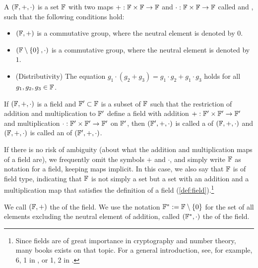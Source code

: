 \begin{definition}[Field]\label{def:field}
A  $ (\mathbb{F}, +, \cdot) $ is a set $\mathbb{F}$  with two maps $ +: \mathbb{F} \times \mathbb{F} \to \mathbb{F} $ and $ \cdot: \mathbb{F} \times \mathbb{F} \to \mathbb{F} $ called  and , such that the following conditions hold:
\begin{itemize}
\item $ \left (\mathbb{F}, + \right) $ is a commutative group, where the neutral element is denoted by $ 0 $.
\item $ \left (\mathbb{F} \setminus \left \{0 \right \}, \cdot \right) $ is a commutative group, where the neutral element is denoted by $ 1 $.
\item (Distributivity) The equation $g_1 \cdot \left (g_2 + g_3 \right) = g_1 \cdot g_2 + g_1 \cdot g_3$  holds for all $ g_1, g_2, g_3 \in \mathbb{F} $.
\end{itemize}
If $(\mathbb{F},+,\cdot)$ is a field and $\mathbb{F}'\subset \mathbb{F}$ is a subset of $\mathbb{F}$ such that the restriction of addition and multiplication to $\mathbb{F}'$ define a field with addition $+: \mathbb{F}'\times \mathbb{F}' \to \mathbb{F}'$ and multiplication $\cdot: \mathbb{F}'\times \mathbb{F}' \to \mathbb{F}'$ on $\mathbb{F}'$, then $(\mathbb{F}',+,\cdot)$ is called a  of $(\mathbb{F},+,\cdot)$ and $(\mathbb{F},+,\cdot)$ is called an  of $(\mathbb{F}',+,\cdot)$.
\end{definition}

\begin{notation} If there is no risk of ambiguity (about what the addition and multiplication maps  of a field are), we frequently omit the symbols $+$ and $\cdot$, and simply write $\mathbb{F}$ as notation for a field, keeping  maps implicit. In this case, we also say that $\mathbb{F}$ is of field type, indicating that $\mathbb{F}$ is not simply a set but a set with an addition and a multiplication map that satisfies the definition of a field (\ref {def:field}).\footnote{Since fields are of great importance in cryptography and number theory, many books exists on that topic. For a general introduction, see, for example, \chaptname{} 6, \secname{} 1 in \cite{mignotte-1992}, or \chaptname{} 1, \secname{} 2 in \cite{nieder-1986}.}

We call $(\mathbb{F},+)$ the  of the field. We use the notation $\mathbb{F}^*:= \mathbb{F} \setminus \left \{0 \right \}$ for the set of all elements excluding the neutral element of addition, called  $(\mathbb{F}^*,\cdot)$ the  of the field.
\end{notation}

